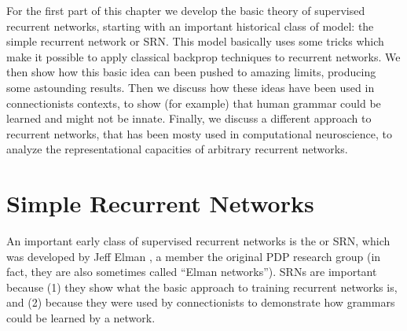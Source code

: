 For the first part of this chapter we develop the basic theory of supervised recurrent networks, starting with an important historical class of model: the simple recurrent network or SRN. This model basically uses some tricks which make it possible to apply classical backprop techniques to recurrent networks. We then show how this basic idea can been pushed to amazing limits, producing some astounding results. Then we discuss how these ideas have been used in connectionists contexts, to show (for example) that human grammar could be learned and might not be innate. Finally, we discuss a different approach to recurrent networks, that has been mosty used in computational neuroscience, to analyze the representational capacities of  arbitrary recurrent networks.
	
\section{Simple Recurrent Networks}

An important early class of supervised recurrent networks is the  or SRN, which  was developed by Jeff Elman \cite{elman1990finding}, a member the original PDP research group  (in fact, they are also sometimes called ``Elman networks''). SRNs are important because (1) they show what the basic approach to training recurrent networks is, and (2) because they were used by connectionists to demonstrate how grammars could be learned by a network. 

